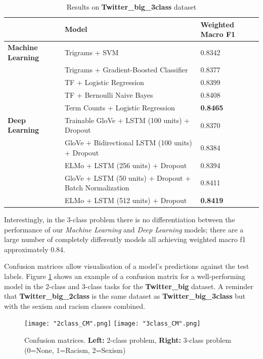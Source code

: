 \documentclass[12pt,a4paper]{article}
\begin{document}
\begin{table}[H]
	\centering
	\vspace*{-12pt}
	\caption{Results on \textbf{Twitter\_big\_3class} dataset}
	\label{results4}
	\hspace*{-1.5cm}
	\begin{tabular}{p{3.4cm} p{10.5cm} p{3.8cm}} \hline\hline
		& \textbf{Model} & \textbf{Weighted Macro F1}  \\ \hline
		
     \textbf{Machine Learning} & Trigrams + SVM & 0.8342 \\
	& Trigrams + Gradient-Boosted Classifier & 0.8377 \\
	& TF + Logistic Regression & 0.8399 \\
	& TF + Bernoulli Naive Bayes & 0.8408 \\
	& Term Counts + Logistic Regression & \textbf{0.8465} \\ \hline
	
	\textbf{Deep Learning} & Trainable GloVe + LSTM (100 units) + Dropout & 0.8370  \\  
	& GloVe + Bidirectional LSTM (100 units) + Dropout & 0.8384  \\
	& ELMo + LSTM (256 units) + Dropout & 0.8394  \\
	& GloVe + LSTM (50 units) + Dropout + Batch Normalization & 0.8411 \\ 
	& ELMo + LSTM (512 units) + Dropout & \textbf{0.8419} \\ \hline
	\end{tabular}
\end{table}

Interestingly, in the 3-class problem there is no differentiation between the performance of our \textit{Machine Learning} and \textit{Deep Learning} models; there are a large number of completely differently models all achieving weighted macro f1 approximately 0.84.

Confusion matrices allow visualisation of a model's predictions against the test labels. Figure \ref{CM:CM2} shows an example of a confusion matrix for a well-performing model in the 2-class and 3-class tasks for the \textbf{Twitter\_big} dataset. A reminder that \textbf{Twitter\_big\_2class} is the same dataset as \textbf{Twitter\_big\_3class} but with the sexism and racism classes combined.

\begin{figure}[H]
	\centering
	\texttt{[image: "2class\_CM".png]} 
	\hspace*{0.05\textwidth}
	\texttt{[image: "3class\_CM".png]}
	\vspace*{-0.5cm}

	\caption{Confusion matrices. \newline\textbf{Left:} 2-class problem, \textbf{Right:} 3-class problem (0=None, 1=Racism, 2=Sexism)}
	\label{CM:CM2}
\end{figure}
\end{document}
